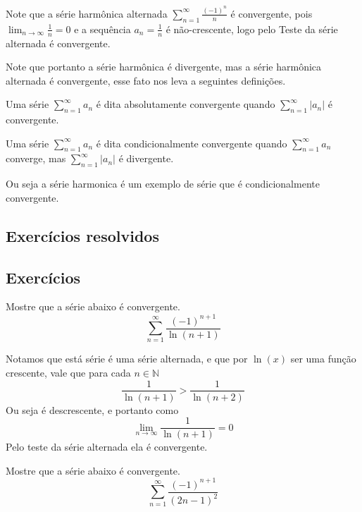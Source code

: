 \begin{ex}
    Note que a série harmônica alternada $\sum_{n = 1}^{\infty} \frac{(-1)^n}{n}$
    é convergente, pois $\lim_{n \to \infty} \frac{1}{n} = 0$ e a sequência 
    $a_n = \frac{1}{n}$ é não-crescente, logo pelo Teste da série alternada é
    convergente.
\end{ex}

Note que portanto a série harmônica é divergente, mas a série harmônica alternada
é convergente, esse fato nos leva a seguintes definições.

Uma série $\sum_{n =1}^{\infty} a_n$ é dita absolutamente convergente quando
$\sum_{n =1}^{\infty} |a_n|$ é convergente.

Uma série $\sum_{n =1}^{\infty} a_n$ é dita condicionalmente convergente quando
$\sum_{n =1}^{\infty} a_n$ converge, mas $\sum_{n =1}^{\infty} |a_n|$ é divergente.

Ou seja a série harmonica é um exemplo de série que é condicionalmente convergente.

\subsection*{Exercícios resolvidos}

\construirExeresol


\subsection*{Exercícios}

\construirExer

\begin{exer}
    Mostre que a série abaixo é convergente.
    $$\sum_{n = 1}^{\infty} \frac{(-1)^{n+1}}{\ln(n+1)} $$
\end{exer}

\begin{resp}
    Notamos que está série é uma série alternada, e que por $\ln(x)$ ser uma
    função crescente, vale que para cada $n \in \mathbb{N}$
    $$\frac{1}{\ln(n+1)} > \frac{1}{\ln (n+2)}$$
    Ou seja é descrescente, e portanto como
    $$\lim_{n \to \infty} \frac{1}{\ln(n+1)} = 0 $$
    Pelo teste da série alternada ela é convergente.
\end{resp}

\begin{exer}
    Mostre que a série abaixo é convergente.
    $$\sum_{n = 1}^{\infty} \frac{(-1)^{n+1}}{(2n-1)^2} $$
\end{exer}

